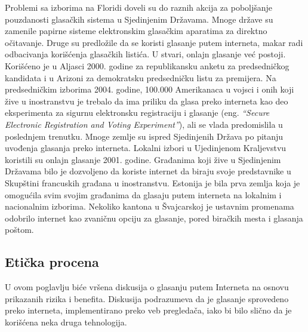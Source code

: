 \documentclass[a4paper]{article}
\theoremstyle{break}
\begin{document}
{Problemi sa izborima na Floridi doveli su do raznih akcija za poboljšanje pouzdanosti glasačkih sistema u Sjedinjenim Državama. Mnoge države su zamenile papirne sisteme elektronskim glasačkim aparatima za direktno očitavanje. Druge su predložile da se koristi glasanje putem interneta, makar radi odbacivanja korišćenja glasačkih listića. U stvari, onlajn glasanje već postoji. Korišćeno je u Aljasci 2000. godine za republikansku anketu za predsedničkog kandidata i u Arizoni za demokratsku predsedničku listu za  premijera. Na predsedničkim izborima 2004. godine, 100.000 Amerikanaca u vojsci i onih koji žive u inostranstvu je trebalo da ima priliku da glasa preko interneta kao deo eksperimenta za sigurnu elektronsku registraciju i glasanje (eng. {\em “Secure Electronic Registration and Voting Experiment”}), ali se vlada predomislila u poslednjem trenutku.
Mnoge zemlje su ispred Sjedinjenih Država po pitanju uvođenja glasanja preko interneta. Lokalni izbori u Ujedinjenom Kraljevstvu koristili su onlajn glasanje 2001. godine. Građanima koji žive u Sjedinjenim Državama bilo je dozvoljeno da koriste internet da biraju svoje predstavnike u Skupštini francuskih građana u inostranstvu. Estonija je bila prva zemlja koja je omogućila svim svojim građanima da glasaju putem interneta na lokalnim i nacionalnim izborima. Nekoliko kantona u Švajcarskoj je ustavnim promenama odobrilo internet kao zvaničnu opciju za glasanje, pored biračkih mesta i glasanja poštom.

\subsection{Etička procena}
\label{subsec:Eticka procena}

U ovom poglavlju biće vršena diskusija o glasanju putem Interneta na osnovu prikazanih rizika i benefita. Diskusija podrazumeva da je glasanje sprovedeno preko interneta, implementirano preko veb pregledača, iako bi bilo slično da je korišćena neka druga tehnologija.\\


}
\end{document}
